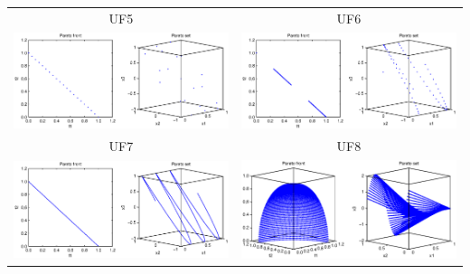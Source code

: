 \begin{table}[]
{\begin{tabular}{cc}
UF5 & UF6 \\
\includegraphics[scale=0.5]{Figures_Chapter2/UF5.eps} & \includegraphics[scale=0.5]{Figures_Chapter2/UF6.eps} \\
UF7 & UF8 \\
\includegraphics[scale=0.5]{Figures_Chapter2/UF7.eps} & \includegraphics[scale=0.5]{Figures_Chapter2/UF8.eps} \\

\end{tabular}}
\end{table}
